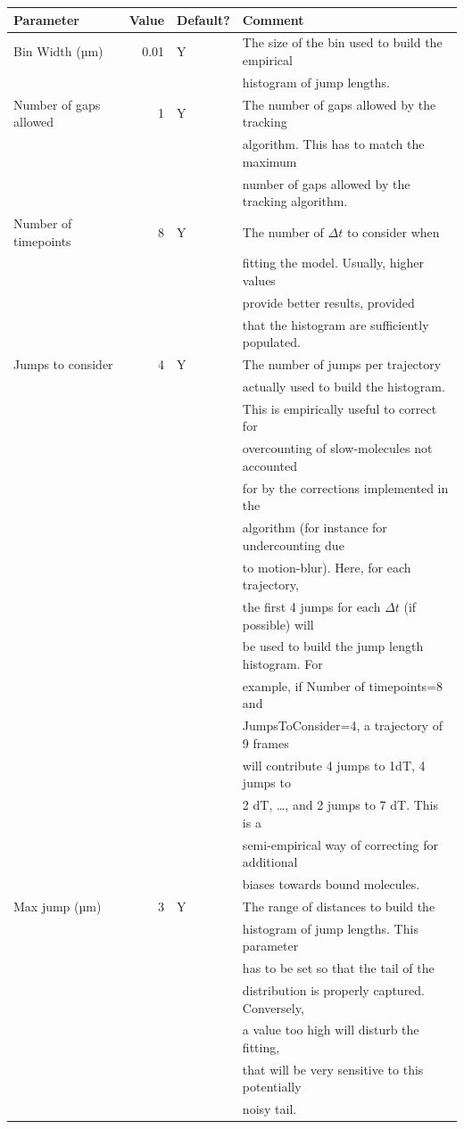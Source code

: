 \begin{center}
  \label{table:table4}
\begin{tabular}{lrll}
  Parameter & Value & Default? & Comment\\
  \hline
  Bin Width (µm) & 0.01 & Y & The size of the bin used to build the empirical \\&&&histogram of jump lengths.\\
  Number of gaps allowed & 1 & Y & The number of gaps allowed by the tracking \\&&&algorithm. This has to match the maximum \\&&&number of gaps allowed by the tracking algorithm.\\
  Number of timepoints & 8 & Y & The number of \(\Delta t\) to consider when \\&&&fitting the model. Usually, higher values \\&&&provide better results, provided \\&&&that the histogram are sufficiently populated.\\
  Jumps to consider & 4 & Y & The number of jumps per trajectory \\&&&actually used to build the histogram. \\&&&This is empirically useful to correct for \\&&&overcounting of slow-molecules not accounted \\&&&for by the corrections implemented in the \\&&&algorithm (for instance for undercounting due \\&&&to motion-blur). Here, for each trajectory, \\&&&the first 4 jumps for each \(\Delta t\) (if possible) will \\&&&be used to build the jump length histogram. For \\&&&example, if Number of timepoints=8 and \\&&&JumpsToConsider=4, a trajectory of 9 frames \\&&&will contribute 4 jumps to 1dT, 4 jumps to \\&&&2 dT, \dots, and 2 jumps to 7 dT. This is a \\&&&semi-empirical way of correcting for additional \\&&&biases towards bound molecules.\\
  Max jump (µm) & 3 & Y & The range of distances to build the \\&&&histogram of jump lengths. This parameter \\&&&has to be set so that the tail of the \\&&&distribution is properly captured. Conversely, \\&&&a value too high will disturb the fitting, \\&&&that will be very sensitive to this potentially \\&&&noisy tail.\\

\end{tabular}
\end{center}
